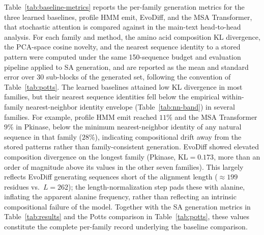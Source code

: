 Table~\ref{tab:baseline-metrics} reports the per-family generation metrics for the three learned baselines, profile HMM emit, EvoDiff, and the MSA Transformer, that stochastic attention is compared against in the main-text head-to-head analysis. For each family and method, the amino acid composition KL divergence, the PCA-space cosine novelty, and the nearest sequence identity to a stored pattern were computed under the same 150-sequence budget and evaluation pipeline applied to SA generation, and are reported as the mean and standard error over 30 sub-blocks of the generated set, following the convention of Table~\ref{tab:potts}. The learned baselines attained low KL divergence in most families, but their nearest sequence identities fell below the empirical within-family nearest-neighbor identity envelope (Table~\ref{tab:nn-band}) in several families. For example, profile HMM emit reached $11\%$ and the MSA Transformer $9\%$ in Pkinase, below the minimum nearest-neighbor identity of any natural sequence in that family ($28\%$), indicating compositional drift away from the stored patterns rather than family-consistent generation. EvoDiff showed elevated composition divergence on the longest family (Pkinase, KL${=}0.173$, more than an order of magnitude above its values in the other seven families). This largely reflects EvoDiff generating sequences short of the alignment length (${\approx}199$ residues vs.\ $L{=}262$); the length-normalization step pads these with alanine, inflating the apparent alanine frequency, rather than reflecting an intrinsic compositional failure of the model. Together with the SA generation metrics in Table~\ref{tab:results} and the Potts comparison in Table~\ref{tab:potts}, these values constitute the complete per-family record underlying the baseline comparison.

